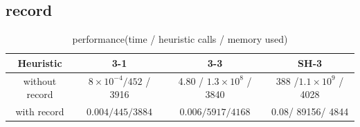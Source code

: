 \documentclass[a4paper, 12pt]{article}  %
\begin{document}
\subsection{record}


\begin{table}[!h]
    \begin{tabular}{c c c c}
        Heuristic & 3-1 & 3-3 & SH-3\\
        \hline
        without record & $8\times 10^{-4} / 452$ / 3916  & 4.80 / $1.3\times 10^8$ / 3840 & 388 /$1.1\times 10^9$ / 4028\\
        with record & $0.004 / 445/3884$  & $0.006 / 5917 / 4168$ & 0.08/ 89156/ 4844
    \end{tabular}
    \caption{performance(time / heuristic calls / memory used)}
\end{table}
\end{document}
